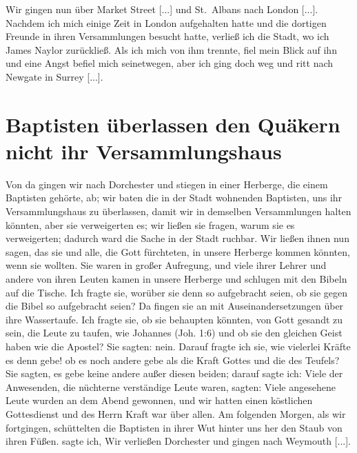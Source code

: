 Wir gingen nun über Market Street [...] 
und St.~Albans
nach London [...]. Nachdem ich mich einige Zeit in London
aufgehalten hatte und die dortigen Freunde in ihren 
Versammlungen besucht hatte, verließ ich die Stadt, wo 
ich James Naylor
zurückließ. Als ich mich von ihm trennte, fiel mein Blick auf
ihn und eine Angst befiel mich seinetwegen, aber ich ging doch
weg und ritt nach Newgate in Surrey [...].

\section{Baptisten überlassen den Quäkern nicht ihr Versammlungshaus}

Von da gingen wir nach Dorchester und stiegen in einer
Herberge, die einem Baptisten gehörte, ab; wir baten die in der
Stadt wohnenden Baptisten, uns ihr Versammlungshaus zu
überlassen, damit wir in demselben Versammlungen halten könnten,
aber sie verweigerten es; wir ließen sie fragen, warum sie es
verweigerten; dadurch ward die Sache in der Stadt ruchbar.
Wir ließen ihnen nun sagen, das sie und alle, die Gott fürchteten,
in unsere Herberge kommen könnten, wenn sie wollten. Sie
waren in großer Aufregung, und viele ihrer Lehrer und andere
von ihren Leuten kamen in unsere Herberge und schlugen mit den
Bibeln auf die Tische. 
Ich fragte sie, worüber sie denn so aufgebracht seien, ob 
sie gegen die Bibel so aufgebracht seien? Da
fingen sie an mit Auseinandersetzungen über ihre 
Wassertaufe.
Ich fragte sie, ob sie behaupten könnten, von Gott gesandt zu
sein, die Leute zu taufen, wie Johannes 
(Joh. 1:6) und ob sie
den gleichen Geist haben wie die Apostel? Sie sagten: nein.
Darauf fragte ich sie, wie vielerlei Kräfte es denn gebe! ob es
noch andere gebe als die Kraft Gottes und die des Teufels?
Sie sagten, es gebe keine andere außer diesen beiden; darauf
sagte ich: 
Viele der Anwesenden, die nüchterne verständige Leute waren,
sagten:  Viele angesehene
Leute wurden an dem Abend gewonnen, und wir hatten einen 
köstlichen Gottesdienst und des Herrn Kraft war über allen. Am
folgenden Morgen, als wir fortgingen, schüttelten die Baptisten in
ihrer Wut hinter uns her den Staub von ihren Füßen. 
sagte ich, 
Wir verließen Dorchester und gingen nach Weymouth [...].


